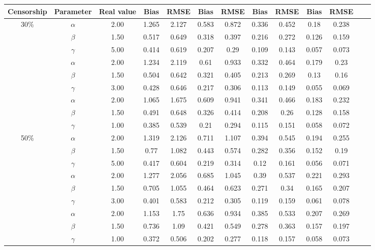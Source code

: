 \documentclass[10pt,a4paper,onecolumn]{article} %
\begin{document}
\begin{table}[H]
\centering
\begin{tabular}{ccccccccccccc}
  \hline
Censorship & Parameter & Real value & Bias & RMSE & Bias & RMSE & Bias & RMSE & Bias & RMSE \\ 
\hline
30\% & $\alpha$ & 2.00 & 1.265 & 2.127 & 0.583 & 0.872 & 0.336 & 0.452 & 0.18 & 0.238 \\ 
   & $\beta$ & 1.50 & 0.517 & 0.649 & 0.318 & 0.397 & 0.216 & 0.272 & 0.126 & 0.159 \\ 
   & $\gamma$ & 5.00 & 0.414 & 0.619 & 0.207 & 0.29 & 0.109 & 0.143 & 0.057 & 0.073 \\ \cmidrule{2-11}
   & $\alpha$ & 2.00 & 1.234 & 2.119 & 0.61 & 0.933 & 0.332 & 0.464 & 0.179 & 0.23 \\ 
   & $\beta$ & 1.50 & 0.504 & 0.642 & 0.321 & 0.405 & 0.213 & 0.269 & 0.13 & 0.16 \\ 
   & $\gamma$ & 3.00 & 0.428 & 0.646 & 0.217 & 0.306 & 0.113 & 0.149 & 0.055 & 0.069 \\ \cmidrule{2-11}
   & $\alpha$ & 2.00 & 1.065 & 1.675 & 0.609 & 0.941 & 0.341 & 0.466 & 0.183 & 0.232 \\ 
   & $\beta$ & 1.50 & 0.491 & 0.648 & 0.326 & 0.414 & 0.208 & 0.26 & 0.128 & 0.158 \\ 
   & $\gamma$ & 1.00 & 0.385 & 0.539 & 0.21 & 0.294 & 0.115 & 0.151 & 0.058 & 0.072 \\ 
   \hline
50\% & $\alpha$ & 2.00 & 1.319 & 2.126 & 0.711 & 1.107 & 0.394 & 0.545 & 0.194 & 0.255 \\ 
   & $\beta$ & 1.50 & 0.77 & 1.082 & 0.443 & 0.574 & 0.282 & 0.356 & 0.152 & 0.19 \\ 
   & $\gamma$ & 5.00 & 0.417 & 0.604 & 0.219 & 0.314 & 0.12 & 0.161 & 0.056 & 0.071 \\ \cmidrule{2-11}
   & $\alpha$ & 2.00 & 1.277 & 2.056 & 0.685 & 1.045 & 0.39 & 0.537 & 0.221 & 0.293 \\ 
   & $\beta$ & 1.50 & 0.705 & 1.055 & 0.464 & 0.623 & 0.271 & 0.34 & 0.165 & 0.207 \\ 
   & $\gamma$ & 3.00 & 0.401 & 0.583 & 0.212 & 0.305 & 0.119 & 0.159 & 0.061 & 0.078 \\ \cmidrule{2-11}
   & $\alpha$ & 2.00 & 1.153 & 1.75 & 0.636 & 0.934 & 0.385 & 0.533 & 0.207 & 0.269 \\ 
   & $\beta$ & 1.50 & 0.736 & 1.09 & 0.421 & 0.549 & 0.278 & 0.363 & 0.157 & 0.197 \\ 
   & $\gamma$ & 1.00 & 0.372 & 0.506 & 0.202 & 0.277 & 0.118 & 0.157 & 0.058 & 0.073 \\ 

\end{tabular}
\end{table}
\end{document}
